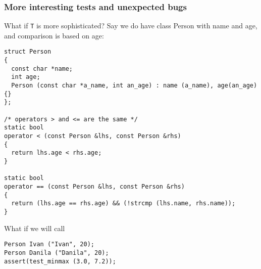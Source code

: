 \documentclass{beamer}
\begin{document}
\begin{frame}[fragile]
\frametitle{More interesting tests and unexpected bugs}

\begin{alertblock}{What if \lstinline!T! is more sophisticated?}
Say we do have class Person with name and age, and comparison is based on age:
\begin{lstlisting}[basicstyle=\tiny]
struct Person
{
  const char *name;
  int age;
  Person (const char *a_name, int an_age) : name (a_name), age(an_age) {}
};

/* operators > and <= are the same */
static bool
operator < (const Person &lhs, const Person &rhs)
{
  return lhs.age < rhs.age;
}

static bool
operator == (const Person &lhs, const Person &rhs)
{
  return (lhs.age == rhs.age) && (!strcmp (lhs.name, rhs.name));
}
\end{lstlisting}

What if we will call 

\begin{lstlisting}[basicstyle=\tiny]
Person Ivan ("Ivan", 20);
Person Danila ("Danila", 20);
assert(test_minmax (3.0, 7.2));
\end{lstlisting}
\end{alertblock}\pause
\end{frame}
\end{document}
